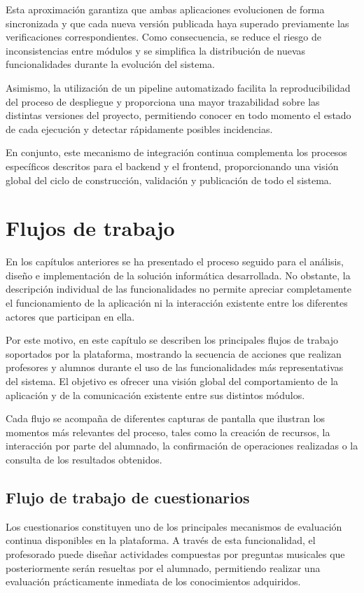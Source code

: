 Esta aproximación garantiza que ambas aplicaciones evolucionen de forma sincronizada y que cada nueva versión publicada haya superado previamente las verificaciones correspondientes. Como consecuencia, se reduce el riesgo de inconsistencias entre módulos y se simplifica la distribución de nuevas funcionalidades durante la evolución del sistema.

Asimismo, la utilización de un pipeline automatizado facilita la reproducibilidad del proceso de despliegue y proporciona una mayor trazabilidad sobre las distintas versiones del proyecto, permitiendo conocer en todo momento el estado de cada ejecución y detectar rápidamente posibles incidencias.

En conjunto, este mecanismo de integración continua complementa los procesos específicos descritos para el backend y el frontend, proporcionando una visión global del ciclo de construcción, validación y publicación de todo el sistema.
\chapter{Flujos de trabajo}
\label{cap:flujos}

En los capítulos anteriores se ha presentado el proceso seguido para el análisis, diseño e implementación de la solución informática desarrollada. No obstante, la descripción individual de las funcionalidades no permite apreciar completamente el funcionamiento de la aplicación ni la interacción existente entre los diferentes actores que participan en ella.

Por este motivo, en este capítulo se describen los principales flujos de trabajo soportados por la plataforma, mostrando la secuencia de acciones que realizan profesores y alumnos durante el uso de las funcionalidades más representativas del sistema. El objetivo es ofrecer una visión global del comportamiento de la aplicación y de la comunicación existente entre sus distintos módulos.

Cada flujo se acompaña de diferentes capturas de pantalla que ilustran los momentos más relevantes del proceso, tales como la creación de recursos, la interacción por parte del alumnado, la confirmación de operaciones realizadas o la consulta de los resultados obtenidos.


\section{Flujo de trabajo de cuestionarios}

Los cuestionarios constituyen uno de los principales mecanismos de evaluación continua disponibles en la plataforma. A través de esta funcionalidad, el profesorado puede diseñar actividades compuestas por preguntas musicales que posteriormente serán resueltas por el alumnado, permitiendo realizar una evaluación prácticamente inmediata de los conocimientos adquiridos.

